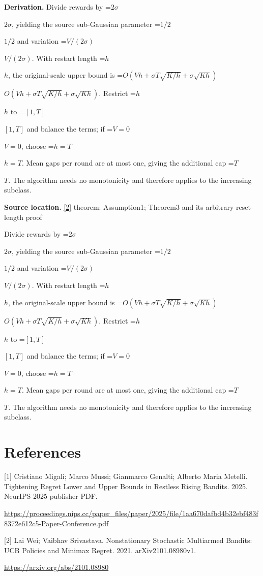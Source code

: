 \documentclass[10pt,a4paper]{article}
\newcommand{\AtlasMath}[1]{\par\begingroup\centering\setbox0=\hbox{$\displaystyle #1$}\ifdim\wd0>1.4\linewidth\typeout{ATLAS WIDE FORMULA: \the\wd0}\fi\ifdim\wd0>\linewidth\resizebox{\linewidth}{!}{\box0}\else\box0\fi\par\endgroup}
\newcommand{\AtlasInlineMath}[1]{\begingroup\setbox0=\hbox{$#1$}\ifdim\wd0>.4\linewidth\endgroup\AtlasMath{#1}\else\endgroup$#1$\fi}
\begin{document}
\textbf{Derivation.} Divide rewards by \AtlasInlineMath{2\sigma}, yielding the source sub-Gaussian parameter \AtlasInlineMath{1/2} and variation \AtlasInlineMath{V/(2\sigma)}. With restart length \AtlasInlineMath{h}, the original-scale upper bound is \AtlasInlineMath{O(Vh+\sigma T\sqrt{K/h}+\sigma\sqrt{Kh})}. Restrict \AtlasInlineMath{h} to \AtlasInlineMath{[1,T]} and balance the terms; if \AtlasInlineMath{V=0}, choose \AtlasInlineMath{h=T}. Mean gaps per round are at most one, giving the additional cap \AtlasInlineMath{T}. The algorithm needs no monotonicity and therefore applies to the increasing subclass.

\textbf{Source location.} \href{https://arxiv.org/abs/2101.08980}{[2]} theorem: Assumption1; Theorem3 and its arbitrary-reset-length proof

Divide rewards by \AtlasInlineMath{2\sigma}, yielding the source sub-Gaussian parameter \AtlasInlineMath{1/2} and variation \AtlasInlineMath{V/(2\sigma)}. With restart length \AtlasInlineMath{h}, the original-scale upper bound is \AtlasInlineMath{O(Vh+\sigma T\sqrt{K/h}+\sigma\sqrt{Kh})}. Restrict \AtlasInlineMath{h} to \AtlasInlineMath{[1,T]} and balance the terms; if \AtlasInlineMath{V=0}, choose \AtlasInlineMath{h=T}. Mean gaps per round are at most one, giving the additional cap \AtlasInlineMath{T}. The algorithm needs no monotonicity and therefore applies to the increasing subclass.

\section{References}
[1] Cristiano Migali; Marco Mussi; Gianmarco Genalti; Alberto Maria Metelli. Tightening Regret Lower and Upper Bounds in Restless Rising Bandits. 2025. NeurIPS 2025 publisher PDF.

\url{https://proceedings.nips.cc/paper_files/paper/2025/file/1aa670dafbd4b32ebf483f8372e612c5-Paper-Conference.pdf}

[2] Lai Wei; Vaibhav Srivastava. Nonstationary Stochastic Multiarmed Bandits: UCB Policies and Minimax Regret. 2021. arXiv2101.08980v1.

\url{https://arxiv.org/abs/2101.08980}
\end{document}
